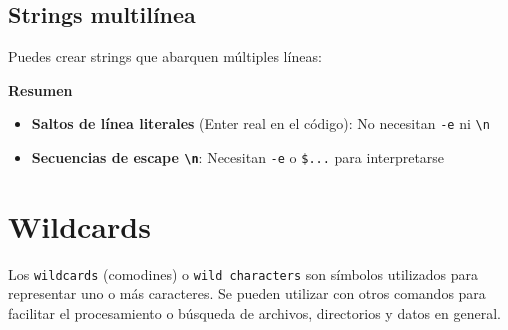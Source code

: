 \documentclass[
  spanish,
  12pt,
  letterpaper,
  DIV=11,
  numbers=noendperiod]{scrreprt}
\newenvironment{Shaded}{\begin{snugshade}}{\end{snugshade}}
\newcommand{\BuiltInTok}[1]{\textcolor[rgb]{0.00,0.23,0.31}{#1}}
\newcommand{\CommentTok}[1]{\textcolor[rgb]{0.37,0.37,0.37}{#1}}
\newcommand{\DataTypeTok}[1]{\textcolor[rgb]{0.68,0.00,0.00}{#1}}
\newcommand{\OperatorTok}[1]{\textcolor[rgb]{0.37,0.37,0.37}{#1}}
\newcommand{\StringTok}[1]{\textcolor[rgb]{0.13,0.47,0.30}{#1}}
\newcommand{\VariableTok}[1]{\textcolor[rgb]{0.07,0.07,0.07}{#1}}
\providecommand{\tightlist}{%
  \setlength{\itemsep}{0pt}\setlength{\parskip}{0pt}}
\begin{document}
\subsection{Strings multilínea}\label{strings-multiluxednea}

Puedes crear strings que abarquen múltiples líneas:

\begin{Shaded}
\end{Shaded}

\textbf{Resumen 🎯}

\begin{itemize}
\tightlist
\item
  \textbf{Saltos de línea literales} (Enter real en el código): No
  necesitan \texttt{-e} ni \texttt{\textbackslash{}n}
\item
  \textbf{Secuencias de escape \texttt{\textbackslash{}n}}: Necesitan
  \texttt{-e} o \texttt{\$\textquotesingle{}...\textquotesingle{}} para
  interpretarse
\end{itemize}

\section{\texorpdfstring{\textbf{Wildcards}}{Wildcards}}\label{wildcards}

Los \texttt{wildcards} (comodines) o \texttt{wild\ characters} son
símbolos utilizados para representar uno o más caracteres. Se pueden
utilizar con otros comandos para facilitar el procesamiento o búsqueda
de archivos, directorios y datos en general.
\end{document}
